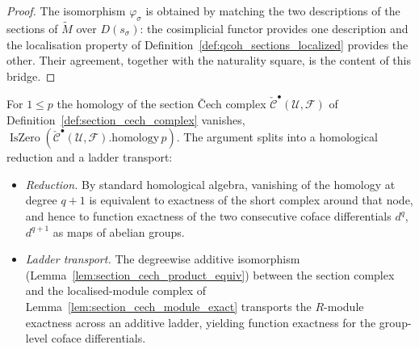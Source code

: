 \begin{proof}
  The isomorphism \(\varphi_\sigma\) is obtained by matching the two descriptions of
  the sections of \(\widetilde{M}\) over \(D(s_\sigma)\): the cosimplicial functor
  provides one description and the localisation property of
  Definition~\ref{def:qcoh_sections_localized} provides the other. Their agreement,
  together with the naturality square, is the content of this bridge.
\end{proof}

\begin{lemma}
  \label{lem:section_cech_ab_exact}
  For \(1 \leq p\) the homology of the section {\v C}ech complex
  \(\check{\mathcal{C}}^\bullet(\mathcal{U}, \mathcal{F})\) of
  Definition~\ref{def:section_cech_complex} vanishes,
  \(\operatorname{IsZero}(\check{\mathcal{C}}^\bullet(\mathcal{U},
  \mathcal{F}).\mathrm{homology}\, p)\). The argument splits into a homological
  reduction and a ladder transport:
  \begin{itemize}
    \item \emph{Reduction.} By standard homological algebra, vanishing of the
      homology at degree \(q+1\) is equivalent to exactness of the short complex
      around that node, and hence to function exactness of the two consecutive
      coface differentials \(d^q\), \(d^{q+1}\) as maps of abelian groups.
    \item \emph{Ladder transport.} The degreewise additive isomorphism
      (Lemma~\ref{lem:section_cech_product_equiv}) between the section complex and
      the localised-module complex of Lemma~\ref{lem:section_cech_module_exact}
      transports the \(R\)-module exactness across an additive ladder, yielding
      function exactness for the group-level coface differentials.
  \end{itemize}
\end{lemma}

